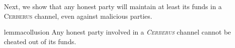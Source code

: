 \documentclass[runningheads]{llncs}
\newcommand{\eg}{{\em e.g.}}
\newcommand{\sys}{\textsc{Cerberus}\xspace}
\begin{document}
\vspace{-4pt}
Next, we show that any honest party will maintain at least its funds in a \sys channel, even against malicious parties.
\begin{restatable}{lemma}{collusion}\label{lem:collusion}
Any honest party involved in a \emph{\sys} channel cannot be cheated out of its funds.
\end{restatable}
    
\end{document}
